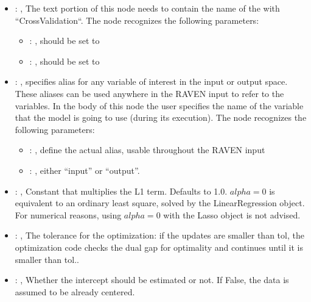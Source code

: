 \begin{itemize}
    \item {}: , 
      The text portion of this node needs to contain the name of the  with
               ``CrossValidation``.
      The  node recognizes the following parameters:
        \begin{itemize}
          \item {}: , 
            should be set to 
          \item {}: , 
            should be set to 
      \end{itemize}

    \item {}: , 
      specifies alias for         any variable of interest in the input or output space. These
      aliases can be used anywhere in the RAVEN input to         refer to the variables. In the body
      of this node the user specifies the name of the variable that the model is going to use
      (during its execution).
      The  node recognizes the following parameters:
        \begin{itemize}
          \item {}: , 
            define the actual alias, usable throughout the RAVEN input
          \item {}: , 
            either ``input'' or ``output''.
      \end{itemize}

    \item {}: , 
      Constant that multiplies the L1 term. Defaults to 1.0.
      $alpha = 0$ is equivalent to an ordinary least square, solved by
      the LinearRegression object. For numerical reasons, using $alpha = 0$
      with the Lasso object is not advised.

    \item {}: , 
      The tolerance for the optimization: if the updates are smaller
      than tol, the optimization code checks the dual gap for optimality and
      continues until it is smaller than tol..

    \item {}: , 
      Whether the intercept should be estimated or not. If False,
      the data is assumed to be already centered.


\end{itemize}
